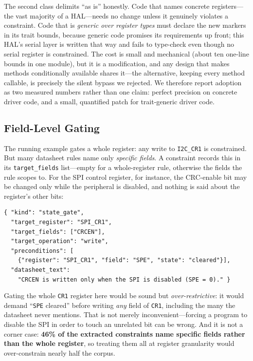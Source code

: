 The second class delimits ``as is'' honestly. Code that names concrete
registers---the vast majority of a HAL---needs no change unless it genuinely
violates a constraint. Code that is \emph{generic over register types} must
declare the new markers in its trait bounds, because generic code promises
its requirements up front; this HAL's serial layer is written that way and
fails to type-check even though no serial register is constrained. The cost
is small and mechanical (about ten one-line bounds in one module), but it is
a modification, and any design that makes methods conditionally available
shares it---the alternative, keeping every method callable, is precisely the
silent bypass we rejected. We therefore report adoption as two measured
numbers rather than one claim: perfect precision on concrete driver code,
and a small, quantified patch for trait-generic driver code.

\subsection{Field-Level Gating}
\label{sec:enforcement:field}

The running example gates a whole register: any write to \texttt{I2C\_CR1}
is constrained. But many datasheet rules name only \emph{specific fields}. A
constraint records this in its \texttt{target\_fields} list---empty for a
whole-register rule, otherwise the fields the rule scopes to. For the SPI
control register, for instance, the CRC-enable bit may be changed only while
the peripheral is disabled, and nothing is said about the register's other
bits:

\begin{lstlisting}
{ "kind": "state_gate",
  "target_register": "SPI_CR1",
  "target_fields": ["CRCEN"],
  "target_operation": "write",
  "preconditions": [
    {"register": "SPI_CR1", "field": "SPE", "state": "cleared"}],
  "datasheet_text":
    "CRCEN is written only when the SPI is disabled (SPE = 0)." }
\end{lstlisting}

Gating the whole \texttt{CR1} register here would be sound but
\emph{over-restrictive}: it would demand ``\texttt{SPE} cleared'' before
writing \emph{any} field of \texttt{CR1}, including the many the datasheet
never mentions. That is not merely inconvenient---forcing a program to
disable the SPI in order to touch an unrelated bit can be wrong. And it is
not a corner case: \textbf{46\% of the extracted constraints name specific
fields rather than the whole register}, so treating them all at register
granularity would over-constrain nearly half the corpus.

